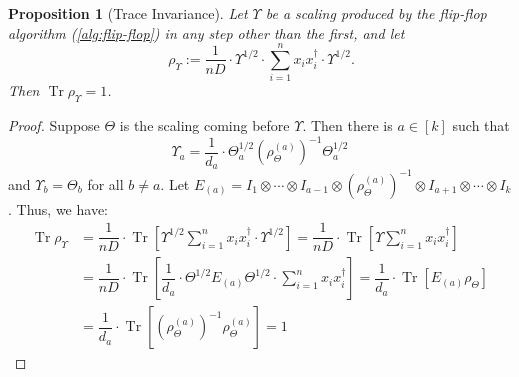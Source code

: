 \documentclass[aos]{imsart}
\newtheorem{prop}[theorem]{Proposition}
\theoremstyle{definition}
\numberwithin{equation}{section}
\DeclareMathOperator{\tr}{Tr}
\begin{document}
\begin{prop}[Trace Invariance]\label{prop:trace-invariance}
	Let $\Upsilon$ be a scaling produced by the flip-flop algorithm (\cref{alg:flip-flop}) in any step other than the first, and let 
	$$ \ \rho_\Upsilon := \dfrac{1}{nD} \cdot \Upsilon^{1/2} \cdot \sum_{i=1}^n x_i x_i^\dagger \cdot \Upsilon^{1/2}.$$ 
	Then $\tr \rho_\Upsilon = 1$.
\end{prop}
\begin{proof}Suppose $\Theta$ is the scaling coming before $\Upsilon$. Then there is $a \in [k]$ such that
	$$\Upsilon_a = \dfrac{1}{d_a} \cdot \Theta_a^{1/2} (\rho_\Theta^{(a)})^{-1} \Theta_a^{1/2} $$
	and $\Upsilon_b = \Theta_b$ for all $b \neq a$. Let $E_{(a)} = I_1 \otimes \cdots \otimes I_{a-1} \otimes (\rho_\Theta^{(a)})^{-1} \otimes I_{a+1} \otimes \cdots \otimes I_k$.
	Thus, we have:
	\begin{align*}
		\tr \rho_\Upsilon 
		&= \dfrac{1}{nD} \cdot \tr\left[ \Upsilon^{1/2} \sum_{i=1}^n x_i x_i^\dagger \cdot \Upsilon^{1/2} \right] 
		= \dfrac{1}{nD} \cdot \tr\left[ \Upsilon \sum_{i=1}^n x_i x_i^\dagger \right] \\
		&= \dfrac{1}{nD} \cdot \tr\left[ \dfrac{1}{d_a} \cdot \Theta^{1/2} E_{(a)} \Theta^{1/2} \cdot \sum_{i=1}^n x_i x_i^\dagger \right] 
		= \dfrac{1}{d_a} \cdot \tr\left[ E_{(a)} \rho_\Theta \right] \\
		&= \dfrac{1}{d_a} \cdot \tr\left[ (\rho_\Theta^{(a)})^{-1} \rho_\Theta^{(a)} \right] = 1
	\end{align*}
\end{proof}
\end{document}
